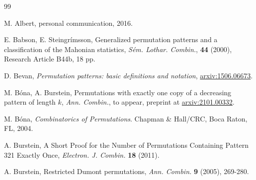 \documentclass[
final
]{dmtcs-episciences}
\theoremstyle{definition}
\theoremstyle{remark}
\begin{document}
{\small

\begin{thebibliography}{99}

 M. Albert, personal communication, 2016.


 E. Babson, E. Steingr\'imsson, Generalized permutation patterns and a classification of the Mahonian statistics, \emph{S\'em. Lothar. Combin.}, \textbf{44} (2000), Research Article B44b, 18 pp.


 D. Bevan, \emph{Permutation patterns: basic definitions and notation}, \href{https://arxiv.org/abs/1506.06673}{arxiv:1506.06673}.

 M. B\'ona, A. Burstein, Permutations with exactly one copy of a decreasing pattern of length $k$, \emph{Ann. Combin.}, to appear, preprint at \href{https://arxiv.org/abs/2101.00332}{arxiv:2101.00332}.

 M. B\'ona, \emph{Combinatorics of Permutations}. Chapman \& Hall/CRC, Boca Raton, FL, 2004.



 A. Burstein, A Short Proof for the Number of Permutations Containing Pattern 321 Exactly Once, \emph{Electron. J. Combin.} \textbf{18} (2011).



 A. Burstein, Restricted Dumont permutations, \emph{Ann. Combin.} \textbf{9} (2005), 269-280.


\end{thebibliography}}
\end{document}

